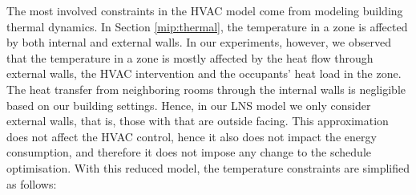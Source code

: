 The most involved constraints in the HVAC model come from modeling building thermal dynamics. In Section \ref{mip:thermal}, the temperature in a zone is affected by both internal and external walls. In our experiments, however, we observed that the temperature in a zone is mostly affected by the heat flow through external walls, the HVAC intervention and the occupants' heat load in the zone. The heat transfer from neighboring rooms through the internal walls is negligible based on our building settings. Hence, in our LNS model we only consider external walls, that is, those with that are outside facing. This approximation does not affect the HVAC control, hence it also does not impact the energy consumption, and therefore it does not impose any change to the schedule optimisation.
With this reduced model, the temperature constraints are simplified as follows:

